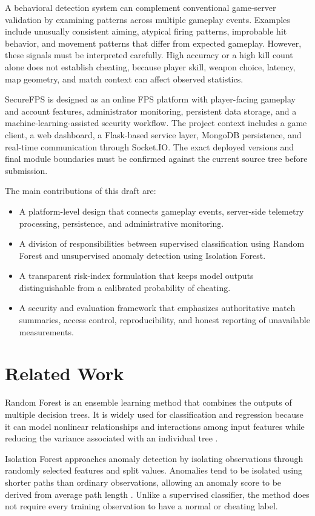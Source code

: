 \documentclass[conference]{IEEEtran}
\begin{document}
A behavioral detection system can complement conventional game-server validation by examining patterns across multiple gameplay events. Examples include unusually consistent aiming, atypical firing patterns, improbable hit behavior, and movement patterns that differ from expected gameplay. However, these signals must be interpreted carefully. High accuracy or a high kill count alone does not establish cheating, because player skill, weapon choice, latency, map geometry, and match context can affect observed statistics.

SecureFPS is designed as an online FPS platform with player-facing gameplay and account features, administrator monitoring, persistent data storage, and a machine-learning-assisted security workflow. The project context includes a game client, a web dashboard, a Flask-based service layer, MongoDB persistence, and real-time communication through Socket.IO. The exact deployed versions and final module boundaries must be confirmed against the current source tree before submission.

The main contributions of this draft are:
\begin{itemize}
    \item A platform-level design that connects gameplay events, server-side telemetry processing, persistence, and administrative monitoring.
    \item A division of responsibilities between supervised classification using Random Forest and unsupervised anomaly detection using Isolation Forest.
    \item A transparent risk-index formulation that keeps model outputs distinguishable from a calibrated probability of cheating.
    \item A security and evaluation framework that emphasizes authoritative match summaries, access control, reproducibility, and honest reporting of unavailable measurements.
\end{itemize}

\section{Related Work}
Random Forest is an ensemble learning method that combines the outputs of multiple decision trees. It is widely used for classification and regression because it can model nonlinear relationships and interactions among input features while reducing the variance associated with an individual tree \cite{breiman2001}.

Isolation Forest approaches anomaly detection by isolating observations through randomly selected features and split values. Anomalies tend to be isolated using shorter paths than ordinary observations, allowing an anomaly score to be derived from average path length \cite{liu2008}. Unlike a supervised classifier, the method does not require every training observation to have a normal or cheating label.
\end{document}
